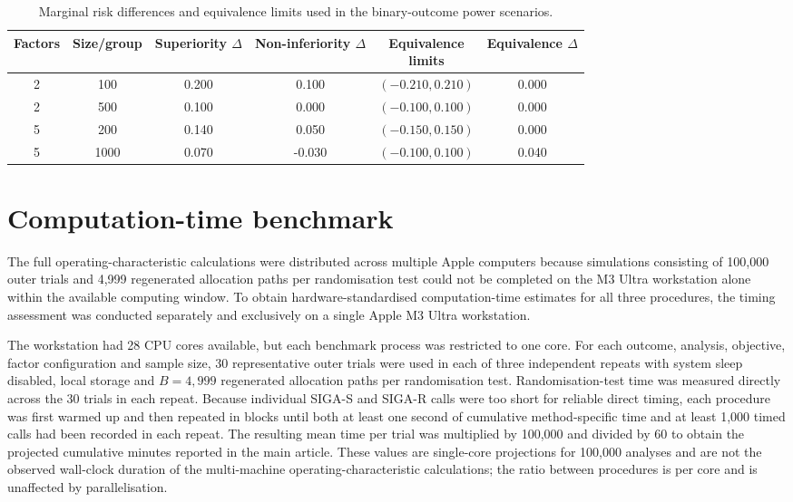 \documentclass[12pt,a4paper]{article}
\theoremstyle{definition}
\theoremstyle{remark}\newtheorem{remark}{Remark}
\numberwithin{equation}{section}
\begin{document}
\clearpage
\begin{table}[!htbp]
\centering
\caption{Marginal risk differences and equivalence limits used in the binary-outcome power scenarios.}
\label{tab:binary-effects}
\small
\setlength{\tabcolsep}{6pt}
\renewcommand{\arraystretch}{1.12}
\begin{tabular}{cccccc}
\toprule
Factors & Size/group & \shortstack{Superiority\\$\Delta$} & \shortstack{Non-inferiority\\$\Delta$} & \shortstack{Equivalence\\limits} & \shortstack{Equivalence\\$\Delta$} \\
\midrule
2 & 100 & 0.200 & 0.100 & $(-0.210,0.210)$ & 0.000 \\
2 & 500 & 0.100 & 0.000 & $(-0.100,0.100)$ & 0.000 \\
5 & 200 & 0.140 & 0.050 & $(-0.150,0.150)$ & 0.000 \\
5 & 1000 & 0.070 & -0.030 & $(-0.100,0.100)$ & 0.040 \\
\bottomrule
\end{tabular}
\end{table}

\section{Computation-time benchmark}\label{sec:supp-timing}

The full operating-characteristic calculations were distributed across multiple Apple computers because simulations consisting of 100,000 outer trials and 4,999 regenerated allocation paths per randomisation test could not be completed on the M3 Ultra workstation alone within the available computing window. To obtain hardware-standardised computation-time estimates for all three procedures, the timing assessment was conducted separately and exclusively on a single Apple M3 Ultra workstation.

The workstation had 28 CPU cores available, but each benchmark process was restricted to one core. For each outcome, analysis, objective, factor configuration and sample size, 30 representative outer trials were used in each of three independent repeats with system sleep disabled, local storage and $B=4{,}999$ regenerated allocation paths per randomisation test. Randomisation-test time was measured directly across the 30 trials in each repeat. Because individual SIGA-S and SIGA-R calls were too short for reliable direct timing, each procedure was first warmed up and then repeated in blocks until both at least one second of cumulative method-specific time and at least 1,000 timed calls had been recorded in each repeat. The resulting mean time per trial was multiplied by 100,000 and divided by 60 to obtain the projected cumulative minutes reported in the main article. These values are single-core projections for 100,000 analyses and are not the observed wall-clock duration of the multi-machine operating-characteristic calculations; the ratio between procedures is per core and is unaffected by parallelisation.
\end{document}
